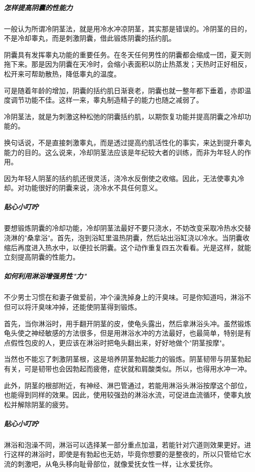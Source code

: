 \subparagraph{怎样提高阴囊的性能力}

一般认为所谓冷阴茎法，就是用冷水冲凉阴茎，其实那是错误的。冷阴茎的目的，不是冷却睾丸，而是刺激阴囊，借此锻炼阴囊的括约肌。

阴囊具有发挥睾丸功能的重要任务。在冬天任何男性的阴囊都会缩成一团，夏天则拖下来。那是因为阴囊在天冷时，会缩小表面积以防止热蒸发；天热时正好相反，松开来可帮助散热，降低睾丸的温度。

可是随着年龄的增加，阴囊的括约肌日渐衰老，阴囊也就一整年都下垂着，亦即温度调节功能不佳。这样一来，睾丸制造精子的能力也随之减弱了。

冷阴茎法，就是为刺激这种松弛的阴囊括约肌，以期恢复功能并提高阴囊之冷却功能的。

换句话说，不是直接刺激睾丸，而是透过提高约肌活性化的事实，来达到提升睾丸能力的目的。这么说来，冷却阴茎法应该是年纪较大者的训练，而非为年轻人的作用。

因为年轻人阴茎的括约肌还很灵活，浇冷水反倒使之收缩。因此，无法使睾丸冷却。对功能很好的阴囊来说，浇冷水不具任何意义。

\subparagraph{贴心小叮咛}

要想锻炼阴囊的冷却功能，冷却阴茎法最好不要只浇水，不妨改变采取冷热水交替浇淋的"桑拿浴"。首先，泡到浴缸里温热阴囊，然后站出浴缸浇以冷水。当阴囊收缩后再度进入热水中，以便拉长阴囊。这个动作重复四五次看看。光是这样，就能立刻提高阴囊的性能力。

\subparagraph{如何利用淋浴增强男性"力"}

不少男士习惯在和妻子做爱前，冲个澡洗掉身上的汗臭味。可是你知道吗，淋浴不但可以将汗臭味冲掉，还能使阴茎得到锻炼。

首先，当你淋浴时，用手翻开阴茎的皮，使龟头露出，然后拿淋浴头冲。虽然锻炼龟头使之神经敏感的方法很多，但是用淋浴水冲的方法最好，也最简单，特别是有点假性包皮的人，更应该在淋浴时把龟头翻出来，好好地做个"阴茎按摩"。

当然也不能忘了刺激阴茎根，这是培养阴茎勃起能力的锻炼。阴茎韧带与阴茎勃起有关，可是韧带也会因勃起而疲倦，症状就和肩酸类似。所以，也得用水冲一冲。

此外，阴茎的根部附近，有神经、淋巴管通过，若能用淋浴头淋浴按摩这个部位，也能得到同样的效果。因此，使用较强劲的淋浴水流，可促进血流循环，使睾丸放松并解除阴茎的疲劳。

\subparagraph{贴心小叮咛}

淋浴和泡澡不同，淋浴可以选择某一部分重点加温，若能针对穴道则效果更好。进行这样的淋浴时，即使是有勃起也无妨，毕竟你想要的是整夜的，所以只管给它水流的刺激吧，从龟头移向耻骨部位，就像爱抚女性一样，让水爱抚你。

